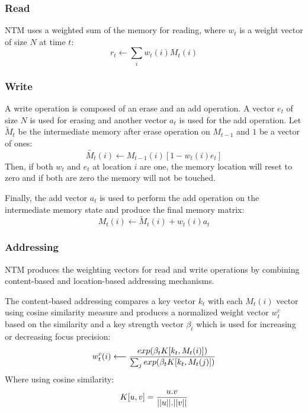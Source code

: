 \documentclass[acmsmall]{acmart}
\begin{document}
\subsubsection{Read}
NTM uses a weighted sum of the memory for reading, where $w_t$ is a weight vector of size $N$ at time $t$:
\begin{equation}
r_t \longleftarrow \sum_{i} w_t(i)M_t(i)
\end{equation}

\subsubsection{Write}
A write operation is composed of an erase and an add operation. A vector $e_t$ of size $N$ is used for erasing and another vector $a_t$ is used for the add operation. Let $\tilde{M}_t$ be the intermediate memory after erase operation on $M_{t-1}$ and $1$ be a vector of ones:
\begin{equation}
\tilde{M_t}(i) \longleftarrow M_{t-1}(i)[1-w_t(i)e_t]
\end{equation}
Then, if both $w_t$ and $e_t$ at location $i$ are one, the memory location will reset to zero and if both are zero the memory will not be touched.

Finally, the add vector $a_t$ is used to perform the add operation on the intermediate memory state and produce the final memory matrix:
\begin{equation}
M_t(i) \longleftarrow \tilde{M}_t(i)+w_t(i)a_t
\end{equation}

\subsubsection{Addressing}
NTM produces the weighting vectors for read and write operations by combining content-based and location-based addressing mechanisms.

The content-based addressing compares a key vector $k_t$ with each $M_t(i)$ vector using cosine similarity measure and produces a normalized weight vector $w_t^c$ based on the similarity and a key strength vector $\beta_t$ which is used for increasing or decreasing focus precision:
\begin{equation}
w_t^c(i) \longleftarrow {{exp(\beta_t K[k_t, M_t(i)])} \over {\sum_{j} exp(\beta_t K[k_t,M_t(j)])}}
\end{equation}
Where using cosine similarity:
\begin{equation}
K[u,v] = {{u.v} \over {||u||.||v||}}
\end{equation}
\end{document}
